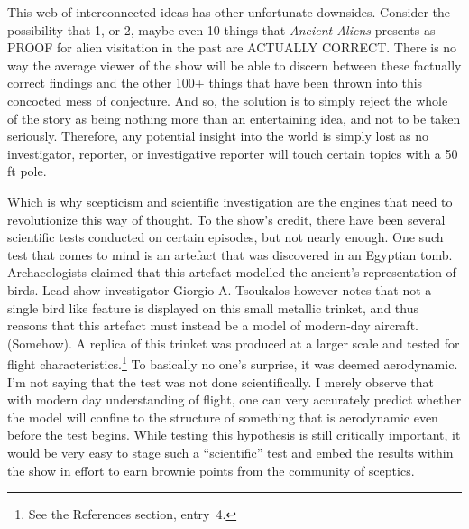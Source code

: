 This web of interconnected ideas has other unfortunate downsides. Consider the
possibility that 1, or 2, maybe even 10 things that \emph{Ancient Aliens} presents
as PROOF for alien visitation in the past are ACTUALLY CORRECT. There is no way
the average viewer of the show will be able to discern between these factually
correct findings and the other 100+ things that have been thrown into this
concocted mess of conjecture. And so, the solution is to simply reject the whole of
the story as being nothing more than an entertaining idea, and not to be taken
seriously. Therefore, any potential insight into the world is simply lost as no
investigator, reporter, or investigative reporter will touch certain topics with a
50 ft pole.

Which is why scepticism and scientific investigation are the engines that need to
revolutionize this way of thought. To the show's credit, there have been several
scientific tests conducted on certain episodes, but not nearly enough. One such
test that comes to mind is an artefact that was discovered in an Egyptian tomb.
Archaeologists claimed that this artefact modelled the ancient's representation of
birds. Lead show investigator Giorgio A. Tsoukalos however notes that not a single
bird like feature is displayed on this small metallic trinket, and thus reasons
that this artefact must instead be a model of modern-day aircraft. (Somehow). A
replica of this trinket was produced at a larger scale and tested for flight
characteristics.\footnote{See the References section, entry~4.} To basically no
one's surprise, it was deemed aerodynamic. I'm not saying that the test was not
done scientifically. I merely observe that with modern day understanding of flight,
one can very accurately predict whether the model will confine to the structure of
something that is aerodynamic even before the test begins. While testing this
hypothesis is still critically important, it would be very easy to stage such a
``scientific'' test and embed the results within the show in effort to earn brownie
points from the community of sceptics.

